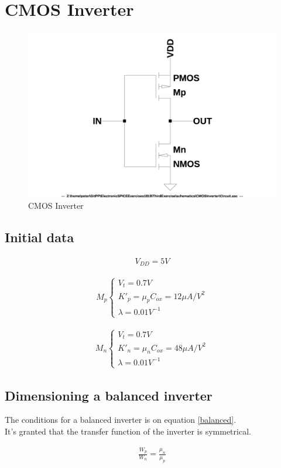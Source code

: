 \chapter{CMOS Inverter}
\begin{figure}[h]
  \centering
  \includegraphics[width=12cm]{schematics/CMOSInverter/Circuit.jpg}
  \caption{CMOS Inverter}
  \label{CMOSInverterCircuit}
\end{figure}
  
\section{Initial data} \label{CIInitialData}
\begin{align}
V_{DD} = 5V
\end{align}

\begin{align} \label{mp}
M_p \left\{
\begin{array}{l}
V_t = 0.7V\\
K'_p = \mu _p C_{ox} = 12 \mu A / V^2\\
\lambda = 0.01 V^{-1}
\end{array}
\right.
\end{align}

\begin{align} \label{mn}
M_n \left\{
\begin{array}{l}
V_t = 0.7V\\
K'_n = \mu _n C_{ox} = 48 \mu A / V^2\\
\lambda = 0.01 V^{-1}
\end{array}
\right.
\end{align}

\section{Dimensioning a balanced inverter}
The conditions for a balanced inverter is on equation \ref{balanced}.\\
It's granted that the transfer function of the inverter is symmetrical.\par
\begin{align}
\frac{W_p}{W_n} = \frac{\mu _n}{\mu _p} \label{balanced}
\end{align}

